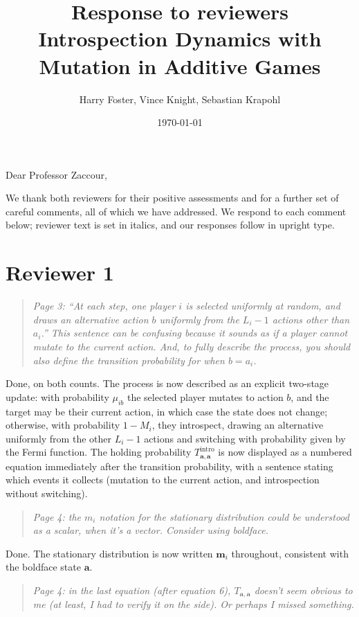 \documentclass[11pt]{article}
\title{Response to reviewers\\
  \large Introspection Dynamics with Mutation in Additive Games}
\author{Harry Foster, Vince Knight, Sebastian Krapohl}
\date{\today}
\newenvironment{reviewerquote}
  {\begin{quote}\itshape}
  {\end{quote}}
\begin{document}
\maketitle

Dear Professor Zaccour,

We thank both reviewers for their positive assessments and for a further
set of careful comments, all of which we have addressed. We respond to
each comment below; reviewer text is set in italics, and our responses
follow in upright type.

\section*{Reviewer 1}

\begin{reviewerquote}
Page 3: ``At each step, one player \(i\) is selected uniformly at random,
and draws an alternative action \(b\) uniformly from the \(L_i-1\) actions
other than \(a_i\).'' This sentence can be confusing because it sounds as
if a player cannot mutate to the current action. And, to fully describe
the process, you should also define the transition probability for when
\(b=a_i\).
\end{reviewerquote}

Done, on both counts. The process is now described as an explicit
two-stage update: with probability \(\mu_{ib}\) the selected player
mutates to action \(b\), and the target may be their current action, in
which case the state does not change; otherwise, with probability
\(1-M_i\), they introspect, drawing an alternative uniformly from the
other \(L_i-1\) actions and switching with probability given by the Fermi
function. The holding probability \(T^{\mathrm{intro}}_{\mathbf{a},
\mathbf{a}}\) is now displayed as a numbered equation immediately after
the transition probability, with a sentence stating which events it
collects (mutation to the current action, and introspection without
switching).

\begin{reviewerquote}
Page 4: the \(m_i\) notation for the stationary distribution could be
understood as a scalar, when it's a vector. Consider using boldface.
\end{reviewerquote}

Done. The stationary distribution is now written \(\mathbf{m}_i\)
throughout, consistent with the boldface state \(\mathbf{a}\).

\begin{reviewerquote}
Page 4: in the last equation (after equation 6),
\(T_{\mathbf{a},\mathbf{a}}\) doesn't seem obvious to me (at least, I had
to verify it on the side). Or perhaps I missed something.
\end{reviewerquote}
\end{document}
